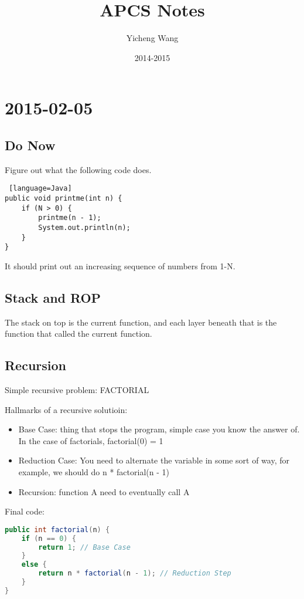 \documentclass [12 pt, twoside] {article}
\begin{document}
\title{APCS Notes}
\author{Yicheng Wang}
\date{2014-2015}

\maketitle
\newpage
\setcounter{tocdepth}{3}
\tableofcontents
\newpage

\section{2015-02-05}
\subsection{Do Now}
Figure out what the following code does.

\begin{lstlisting} [language=Java]
public void printme(int n) {
	if (N > 0) {
		printme(n - 1);
		System.out.println(n);
	}
}
\end{lstlisting}

It should print out an increasing sequence of numbers
from 1-N.

\subsection{Stack and ROP}
The stack on top is the current function, and each layer beneath that
is the function that called the current function.

\subsection{Recursion}



Simple recursive problem: FACTORIAL


Hallmarks of a recursive solutioin:
\begin{itemize}
	\item Base Case: thing that stops the program, simple case you know the answer of. In the case of factorials, factorial(0) = 1
	\item Reduction Case: You need to alternate the variable in some sort of way, for example, we should do n * factorial(n - 1)
	\item Recursion: function A need to eventually call A
\end{itemize}


Final code:
\begin{lstlisting}[language=Java]
public int factorial(n) {
	if (n == 0) {
		return 1; // Base Case
	}
	else {
		return n * factorial(n - 1); // Reduction Step
	}
}
\end{lstlisting}
\end{document}
